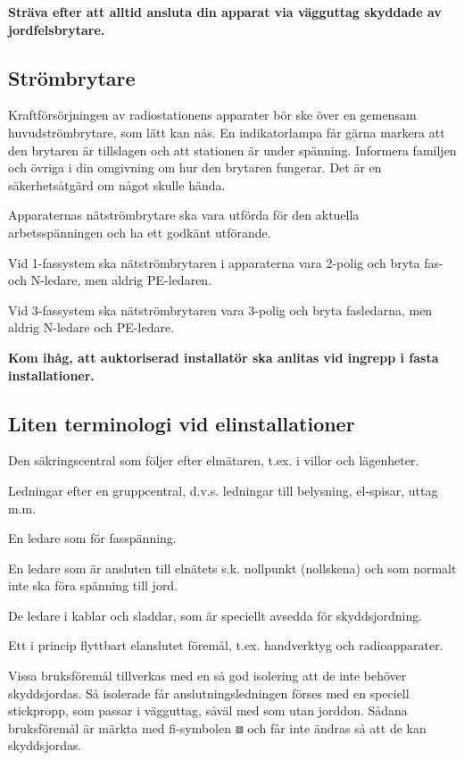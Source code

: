 \textbf{Sträva efter att alltid ansluta din apparat via vägguttag
	skyddade av jordfelsbrytare.}


\subsection{Strömbrytare}

Kraftförsörjningen av radiostationens apparater bör ske över en
gemensam huvudströmbrytare, som lätt kan nås. En indikatorlampa får
gärna markera att den brytaren är tillslagen och att stationen är
under spänning. Informera familjen och övriga i din omgivning om hur
den brytaren fungerar. Det är en säkerhetsåtgärd om något skulle hända.

Apparaternas nätströmbrytare ska vara utförda för den aktuella
arbetsspänningen och ha ett godkänt utförande.

Vid 1-fassystem ska nätströmbrytaren i apparaterna vara 2-polig och
bryta fas- och N-ledare, men aldrig PE-ledaren.

Vid 3-fassystem ska nätströmbrytaren vara 3-polig och bryta fasledarna,
men aldrig N-ledare och PE-ledare.

\textbf{Kom ihåg, att auktoriserad installatör ska
  anlitas vid ingrepp i fasta installationer.}

\subsection{Liten terminologi vid elinstallationer}
\begin{description}[style=nextline]
\item[Gruppcentral] Den säkringscentral som följer efter elmätaren,
  t.ex. i villor och lägenheter.
\item[Gruppledningar] Ledningar efter en gruppcentral, d.v.s.
  ledningar till belysning, el-spisar, uttag m.m.
\item[Fasledare] En ledare som för fasspänning.
\item[Nolledare (N-ledare)] En ledare som är ansluten till elnätets
  s.k.  nollpunkt (nollskena) och som normalt inte ska föra spänning
  till jord.
\item[Skyddsledare (PE-ledare)] De ledare i kablar och sladdar, som är
  speciellt avsedda för skyddsjordning.
\item[Bruksföremål] Ett i princip flyttbart elanslutet föremål,
  t.ex. handverktyg och radioapparater.
\item[Förstärkt isolering] Vissa bruksföremål tillverkas med en så god
  isolering att de inte behöver skyddsjordas. Så isolerade får
  anslutningsledningen förses med en speciell stickpropp, som passar i
  vägguttag, såväl med som utan jorddon. Sådana bruksföremål är märkta
  med fi-symbolen \(\boxbox\) och får inte ändras så att de kan skyddsjordas.
\end{description}

